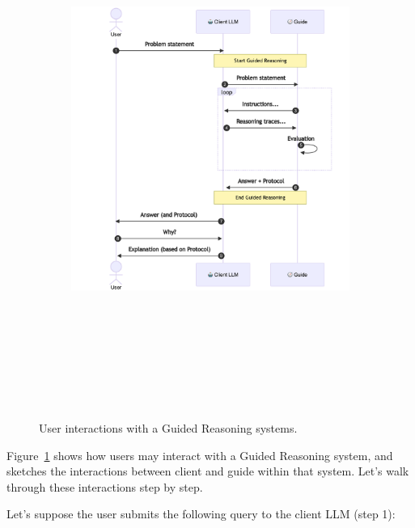 \documentclass[
  letterpaper,
  DIV=11,
  numbers=noendperiod]{scrartcl}
\begin{document}
\begin{figure}

{\centering 

\begin{figure}[H]

{\centering \includegraphics[width=6.5in,height=6.63in]{intro_guided_reasoning_files/figure-latex/mermaid-figure-1.png}

}

\end{figure}

}

\caption{\label{fig-global-gr}User interactions with a Guided Reasoning
systems.}

\end{figure}

Figure~\ref{fig-global-gr} shows how users may interact with a Guided
Reasoning system, and sketches the interactions between client and guide
within that system. Let's walk through these interactions step by step.

Let's suppose the user submits the following query to the client LLM
(step 1):
\end{document}
